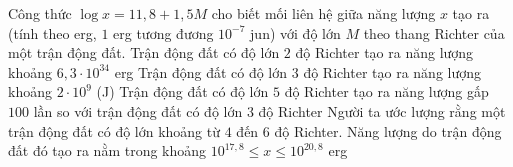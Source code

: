\begin{ex}%
	Công thức $\log x=11{,}8+1{,}5M$ cho  biết mối liên hệ giữa năng lượng $x$ tạo ra (tính theo erg, $1$ erg tương đương $10^{-7}$ jun) với độ lớn $M$ theo thang Richter của một trận động đất.
	 \choiceTF
		{Trận động đất có độ lớn $2$ độ Richter tạo ra năng lượng khoảng $6{,}3\cdot  10^{34}$ erg}
		{\True Trận động đất có độ lớn $3$ độ Richter tạo  ra năng lượng khoảng $2\cdot 10^{9}$ (J)}
		{Trận động đất có độ lớn $5$ độ Richter tạo  ra năng lượng gấp $100$ lần so với trận động đất có độ lớn $3$ độ Richter}
		{\True Người ta ước lượng rằng một trận động đất có độ lớn khoảng từ $4$ đến $6$ độ Richter. Năng lượng do trận động đất đó tạo ra nằm trong khoảng $10^{17{,}8}\leqslant x\leqslant 10^{20{,}8}$ erg} 
\end{ex}


